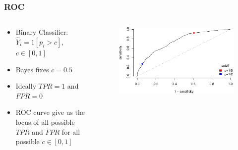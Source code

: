 \documentclass[
  shownotes,
  xcolor={svgnames},
  hyperref={colorlinks,citecolor=DarkBlue,linkcolor=DarkRed,urlcolor=DarkBlue}
  , aspectratio=169]{beamer}
\begin{document}
\begin{frame}[fragile]
\frametitle{ROC}

\begin{columns}[T] %
\begin{column}{.52\textwidth}
  \begin{itemize}
    \item Binary Classifier: $\hat{Y}_i=1[p_i>c]$, $c\in[0,1]$
    \medskip
    \item Bayes fixes $c=0.5$
    \medskip
    \item Ideally $TPR=1$  and $FPR=0$
    \medskip
    \item ROC curve give us the locus of all possible $TPR$ and $FPR$ for all possible $c\in[0,1]$
  \end{itemize}
\end{column}  
\hfill
\begin{column}{.48\textwidth}

 \begin{figure}[H] \centering
            \captionsetup{justification=centering}
              \includegraphics[scale=0.4]{figures/roc}                            
 \end{figure}

\end{column}
\end{columns}

\end{frame}
\end{document}
